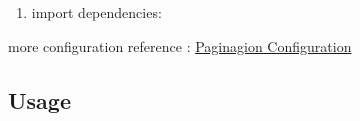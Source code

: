 \documentclass[
]{book}
\newenvironment{Shaded}{\begin{snugshade}}{\end{snugshade}}
\newcommand{\KeywordTok}[1]{\textcolor[rgb]{0.13,0.29,0.53}{\textbf{#1}}}
\newcommand{\NormalTok}[1]{#1}
\begin{document}
\begin{enumerate}
\def\labelenumi{\arabic{enumi}.}
\item
  import dependencies:

\begin{Shaded}
\end{Shaded}
\end{enumerate}

more configuration reference : \protect\hyperlink{pagination_configuration}{Paginagion Configuration}

\hypertarget{pagination_apachedbutils_usage}{%
\subsection{Usage}\label{pagination_apachedbutils_usage}}
\end{document}
